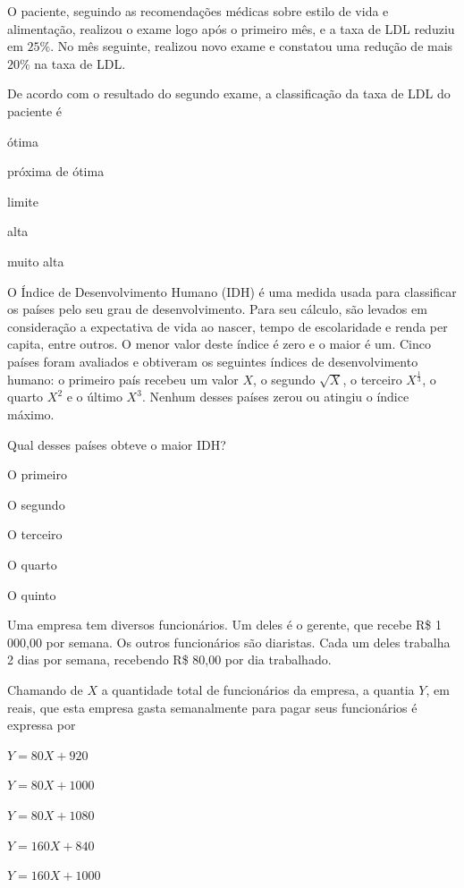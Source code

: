 
O paciente, seguindo as recomendações médicas sobre estilo de vida e alimentação,
realizou o exame logo após o primeiro mês, e a taxa de LDL reduziu em $25\%$.
No mês seguinte, realizou novo exame e constatou uma redução de mais $20\%$ na taxa de LDL.

De acordo com o resultado do segundo exame, a classificação da taxa de LDL do paciente é

\begin{alternativas}
\item ótima
\item próxima de ótima
\item limite
\item alta
\item muito alta
\end{alternativas}

\questao
O Índice de Desenvolvimento Humano (IDH) é uma
medida usada para classificar os países pelo seu grau
de desenvolvimento. Para seu cálculo, são levados em
consideração a expectativa de vida ao nascer, tempo de
escolaridade e renda per capita, entre outros. O menor
valor deste índice é zero e o maior é um. Cinco países
foram avaliados e obtiveram os seguintes índices de
desenvolvimento humano: o primeiro país recebeu um
valor $X$, o segundo $\sqrt{X}$, o terceiro $\displaystyle X^{\frac{1}{3}}$,
o quarto $X^2$ e o último $X^3$. Nenhum desses países zerou ou atingiu o
índice máximo.

Qual desses países obteve o maior IDH?

\begin{alternativas}
\item O primeiro
\item O segundo
\item O terceiro
\item O quarto
\item O quinto
\end{alternativas}

\questao
Uma empresa tem diversos funcionários. Um deles
é o gerente, que recebe R\$ 1 000,00 por semana.
Os outros funcionários são diaristas. Cada um deles
trabalha 2 dias por semana, recebendo R\$ 80,00 por
dia trabalhado.

Chamando de $X$ a quantidade total de funcionários
da empresa, a quantia $Y$, em reais, que esta empresa
gasta semanalmente para pagar seus funcionários é
expressa por
\begin{alternativas}
\item $Y = 80X + 920$
\item $Y = 80X + 1000$
\item $Y = 80X + 1080$
\item $Y = 160X + 840$
\item $Y = 160X + 1000$
\end{alternativas}

